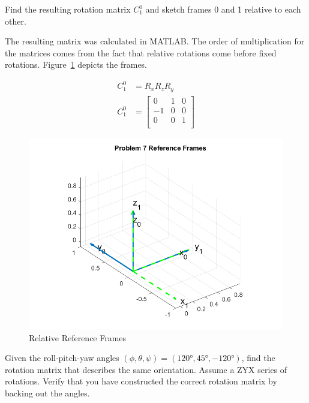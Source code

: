 \documentclass[12pt,letterpaper, onecolumn]{exam}
\begin{document}
\begin{questions}
    Find the resulting rotation matrix $C_{1}^{0}$ and sketch frames {0} and {1} relative to each other.

    \solution
    The resulting matrix was calculated in MATLAB\@. The order of multiplication for the matrices comes from the fact that relative rotations come before fixed rotations. Figure~\ref{fig:relaxes} depicts the frames.

    \begin{equation*}
        \begin{split}
            C_1^0 & = R_xR_zR_y \\
            C_1^0 & =
            \begin{bmatrix}
                0  & 1 & 0 \\
                -1 & 0 & 0 \\
                0  & 0 & 1 \\
            \end{bmatrix}
        \end{split}
    \end{equation*}

    \begin{figure}[!h]
        \centering
        \includegraphics[width=\linewidth]{assets/HW2_P7_FIG.png}
        \caption{Relative Reference Frames}
        \label{fig:relaxes}
    \end{figure}

    \clearpage

    \question
    Given the roll-pitch-yaw angles $(\phi, \theta, \psi) = (120 \unit{\degree}, 45 \unit{\degree}, -120 \unit{\degree})$, find the rotation matrix that describes the same orientation. Assume a ZYX series of rotations. Verify that you have constructed the correct rotation matrix by backing out the angles.


\end{questions}
\end{document}
